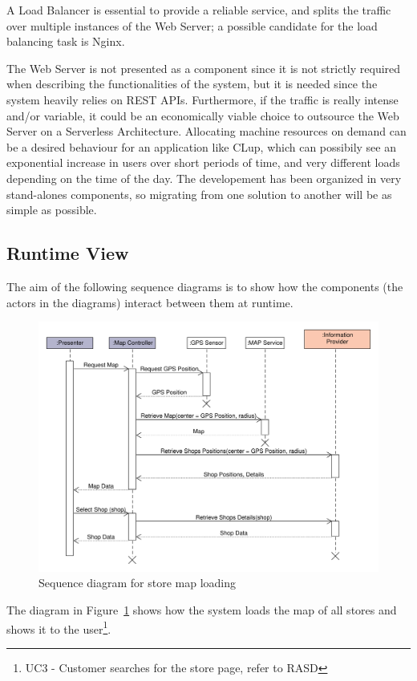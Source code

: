 A Load Balancer is essential to provide a reliable service, and splits the traffic over multiple instances of the Web Server; a possible candidate for the load balancing task is Nginx.

\medskip

The Web Server is not presented as a component since it is not strictly required when describing the functionalities of the system, but it is needed since the system heavily relies on REST APIs. Furthermore, if the traffic is really intense and/or variable, it could be an economically viable choice to outsource the Web Server on a Serverless Architecture. Allocating machine resources on demand can be a desired behaviour for an application like CLup, which can possibily see an exponential increase in users over short periods of time, and very different loads depending on the time of the day. The developement has been organized in very stand-alones components, so migrating from one solution to another will be as simple as possible.



\clearpage
\subsection{Runtime View}
The aim of the following sequence diagrams is to show how the components (the actors in the diagrams) interact between them at runtime.
\begin{figure}[H]
    \includegraphics[width=\textwidth]{Images/UML_user_map_sequence.pdf}
    \caption{\label{fig:UML_user_map_sequence}Sequence diagram for store map loading}
\end{figure}
The diagram in Figure~\ref{fig:UML_user_map_sequence} shows how the system loads the map of all stores and shows it to the user\footnote{UC3 - Customer searches for the store page, refer to RASD}.

